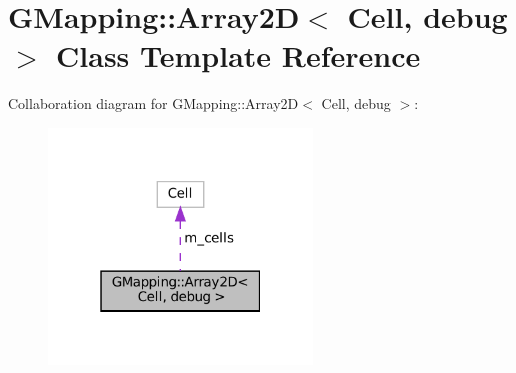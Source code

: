 \hypertarget{classGMapping_1_1Array2D}{}\section{G\+Mapping\+:\+:Array2D$<$ Cell, debug $>$ Class Template Reference}
\label{classGMapping_1_1Array2D}


Collaboration diagram for G\+Mapping\+:\+:Array2D$<$ Cell, debug $>$\+:
\nopagebreak
\begin{figure}[H]
\begin{center}
\leavevmode
\includegraphics[width=199pt]{classGMapping_1_1Array2D__coll__graph}
\end{center}
\end{figure}
